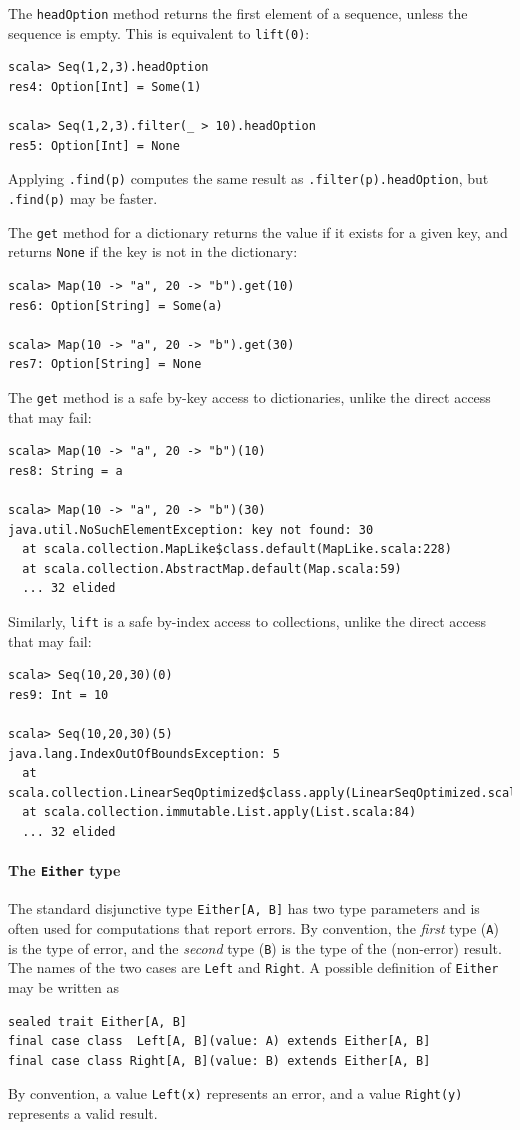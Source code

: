 The \lstinline!headOption! method returns the first element of a
sequence, unless the sequence is empty. This is equivalent to \lstinline!lift(0)!:
\begin{lstlisting}
scala> Seq(1,2,3).headOption
res4: Option[Int] = Some(1)

scala> Seq(1,2,3).filter(_ > 10).headOption
res5: Option[Int] = None
\end{lstlisting}
Applying \lstinline!.find(p)! computes the same result as \lstinline!.filter(p).headOption!,
but \lstinline!.find(p)! may be faster.

The \lstinline!get! method for a dictionary returns the value if
it exists for a given key, and returns \lstinline!None! if the key
is not in the dictionary:
\begin{lstlisting}
scala> Map(10 -> "a", 20 -> "b").get(10)
res6: Option[String] = Some(a)

scala> Map(10 -> "a", 20 -> "b").get(30)
res7: Option[String] = None 
\end{lstlisting}
The \lstinline!get! method is a safe by-key access to dictionaries,
unlike the direct access that may fail:
\begin{lstlisting}
scala> Map(10 -> "a", 20 -> "b")(10)
res8: String = a 

scala> Map(10 -> "a", 20 -> "b")(30)
java.util.NoSuchElementException: key not found: 30
  at scala.collection.MapLike$class.default(MapLike.scala:228)
  at scala.collection.AbstractMap.default(Map.scala:59)
  ... 32 elided
\end{lstlisting}
Similarly, \lstinline!lift! is a safe by-index access to collections,
unlike the direct access that may fail:
\begin{lstlisting}
scala> Seq(10,20,30)(0)
res9: Int = 10

scala> Seq(10,20,30)(5)
java.lang.IndexOutOfBoundsException: 5
  at scala.collection.LinearSeqOptimized$class.apply(LinearSeqOptimized.scala:65)
  at scala.collection.immutable.List.apply(List.scala:84)
  ... 32 elided
\end{lstlisting}


\paragraph{The \texttt{Either} type}

The standard disjunctive type \lstinline!Either[A, B]! has two type
parameters and is often used for computations that report errors.
By convention, the \emph{first} type (\lstinline!A!) is the type
of error, and the \emph{second} type (\lstinline!B!) is the type
of the (non-error) result. The names of the two cases are \lstinline!Left!
and \lstinline!Right!. A possible definition of \lstinline!Either!
may be written as
\begin{lstlisting}
sealed trait Either[A, B]
final case class  Left[A, B](value: A) extends Either[A, B]
final case class Right[A, B](value: B) extends Either[A, B]
\end{lstlisting}
By convention, a value \lstinline!Left(x)! represents an error, and
a value \lstinline!Right(y)! represents a valid result.

